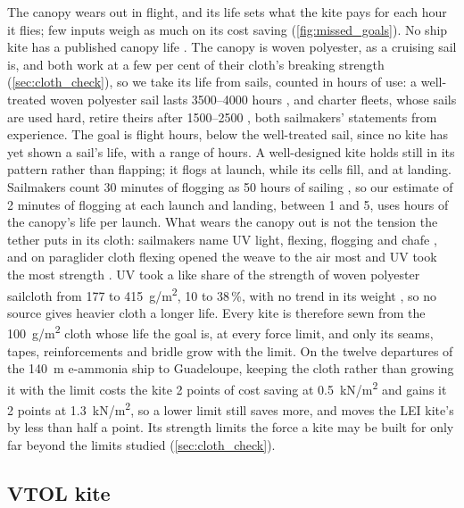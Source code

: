 The canopy wears out in flight, and its life sets what the kite pays for each hour it flies; few inputs weigh as much on its cost saving (\cref{fig:missed_goals}). No ship kite has a published canopy life \citep{emsa2023}. The canopy is woven polyester, as a cruising sail is, and both work at a few per cent of their cloth's breaking strength (\cref{sec:cloth_check}), so we take its life from sails, counted in hours of use: a well-treated woven polyester sail lasts \numrange{3500}{4000} hours \citep{flynn2015}, and charter fleets, whose sails are used hard, retire theirs after \numrange{1500}{2500} \citep{northsails_durability}, both sailmakers' statements from experience. The goal is  flight hours, below the well-treated sail, since no kite has yet shown a sail's life, with a range of  hours. A well-designed kite holds still in its pattern rather than flapping; it flogs at launch, while its cells fill, and at landing. Sailmakers count 30 minutes of flogging as 50 hours of sailing \citep{northsails_durability}, so our estimate of 2 minutes of flogging at each launch and landing, between 1 and 5, uses  hours of the canopy's life per launch. What wears the canopy out is not the tension the tether puts in its cloth: sailmakers name UV light, flexing, flogging and chafe \citep{flynn2015,northsails_durability}, and on paraglider cloth flexing opened the weave to the air most and UV took the most strength \citep{maslanka2023}. UV took a like share of the strength of woven polyester sailcloth from 177 to \SI{415}{g/m^2}, 10 to 38\,\%, with no trend in its weight \citep[Table~3]{ceylan2023}, so no source gives heavier cloth a longer life. Every kite is therefore sewn from the \SI{100}{g/m^2} cloth whose life the goal is, at every force limit, and only its seams, tapes, reinforcements and bridle grow with the limit. On the twelve departures of the \SI{140}{m} e-ammonia ship to Guadeloupe, keeping the cloth rather than growing it with the limit costs the kite 2 points of cost saving at \SI{0.5}{kN/m^2} and gains it 2 points at \SI{1.3}{kN/m^2}, so a lower limit still saves more, and moves the LEI kite's by less than half a point. Its strength limits the force a kite may be built for only far beyond the limits studied (\cref{sec:cloth_check}).

\subsection{VTOL kite}
\label{sec:rigid_kite}

